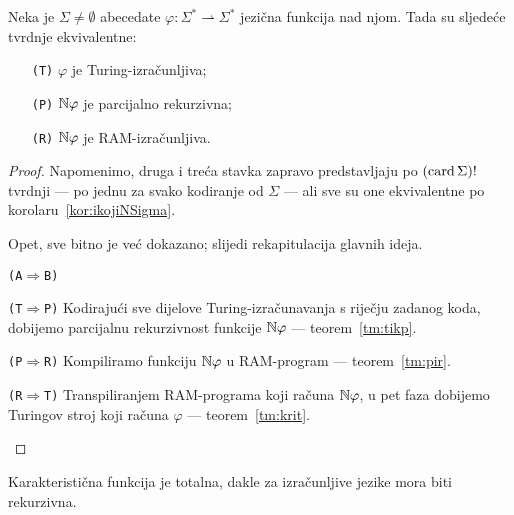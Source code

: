 \begin{teorem}\label{tm:eqjf}
Neka je $\Sigma\ne\emptyset$ abeceda\newline te $\varphi:\Sigma^*\rightharpoonup\Sigma^*$ jezična funkcija nad njom. Tada su sljedeće tvrdnje ekvivalentne:
\begin{itemize}
    \item[\texttt{\textup{(T)}}] $\varphi$ je Turing-izračunljiva;
    \item[\texttt{\textup{(P)}}] ${\mathbb N}\varphi$ je parcijalno rekurzivna;
    \item[\texttt{\textup{(R)}}] ${\mathbb N}\varphi$ je RAM-izračunljiva.
\end{itemize}
\end{teorem}
\begin{proof}
Napomenimo, druga i treća stavka zapravo predstavljaju po $(\operatorname{card}\Sigma)!$ tvrdnji --- po jednu za svako kodiranje od $\Sigma$ --- ali sve su one ekvivalentne po korolaru~\ref{kor:ikojiNSigma}.

Opet, sve bitno je već dokazano; slijedi rekapitulacija glavnih ideja.
\begin{labeling}{\texttt{(A$\Rightarrow$B)}}
\item[\texttt{(T$\Rightarrow$P)}] Kodirajući sve dijelove Turing-izračunavanja s riječju zadanog koda, dobijemo parcijalnu rekurzivnost funkcije ${\mathbb N}\varphi$ --- teorem~\ref{tm:tikp}.
\item[\texttt{(P$\Rightarrow$R)}] Kompiliramo funkciju ${\mathbb N}\varphi$ u RAM-program --- teorem~\ref{tm:pir}.
\item[\texttt{(R$\Rightarrow$T)}] Transpiliranjem RAM-programa koji računa ${\mathbb N}\varphi$, u pet faza dobijemo Turingov stroj koji računa $\varphi$ --- teorem~\ref{tm:krit}.\qedhere
\end{labeling}
\end{proof}

\noindent Karakteristična funkcija je totalna, dakle za izračunljive jezike mora biti rekurzivna.

